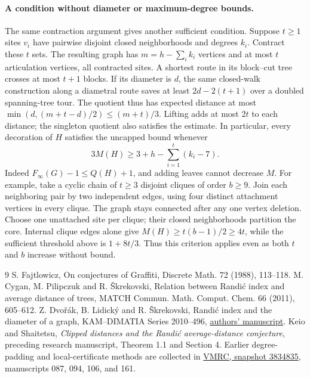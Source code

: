 \documentclass[11pt,a4paper]{article}
\begin{document}
\paragraph{A condition without diameter or maximum-degree bounds.}
The same contraction argument gives another sufficient condition. Suppose $t\ge1$ sites $v_i$ have pairwise disjoint closed neighborhoods and degrees $k_i$. Contract these $t$ sets. The resulting graph has $m=h-\sum_i k_i$ vertices and at most $t$ articulation vertices, all contracted sites. A shortest route in its block--cut tree crosses at most $t+1$ blocks. If its diameter is $d$, the same closed-walk construction along a diametral route saves at least $2d-2(t+1)$ over a doubled spanning-tree tour. The quotient thus has expected distance at most $\min(d,(m+t-d)/2)\le(m+t)/3$. Lifting adds at most $2t$ to each distance; the singleton quotient also satisfies the estimate. In particular, every decoration of $H$ satisfies the uncapped bound whenever
\[
 3M(H)\ge 3+h-\sum_{i=1}^t(k_i-7).
\]
Indeed $F_\infty(G)-1\le Q(H)+1$, and adding leaves cannot decrease $M$. For example, take a cyclic chain of $t\ge3$ disjoint cliques of order $b\ge9$. Join each neighboring pair by two independent edges, using four distinct attachment vertices in every clique. The graph stays connected after any one vertex deletion. Choose one unattached site per clique; their closed neighborhoods partition the core. Internal clique edges alone give $M(H)\ge t(b-1)/2\ge4t$, while the sufficient threshold above is $1+8t/3$. Thus this criterion applies even as both $t$ and $b$ increase without bound.

\begin{thebibliography}{9}
 S. Fajtlowicz, On conjectures of Graffiti, Discrete Math. 72 (1988), 113--118.
 M. Cygan, M. Pilipczuk and R. \v{S}krekovski, Relation between Randi\'c index and average distance of trees, MATCH Commun. Math. Comput. Chem. 66 (2011), 605--612.
 Z. Dvo\v{r}\'ak, B. Lidick\'y and R. \v{S}krekovski, Randi\'c index and the diameter of a graph, KAM--DIMATIA Series 2010--496, \href{https://iti.mff.cuni.cz/series/2010/496.pdf}{authors' manuscript}.
 Keio and Shaitetsu, \emph{Clipped distances and the Randi\'c average-distance conjecture}, preceding research manuscript, Theorem 1.1 and Section 4. Earlier degree-padding and local-certificate methods are collected in \href{https://github.com/QEEDDD/Verifiable-Mathematical-Reasoning-Corpus/tree/38348353416f1f7fc50cecb93c3b554a00260c13}{VMRC, snapshot 3834835}, manuscripts 087, 094, 106, and 161.
\end{thebibliography}
\end{document}
